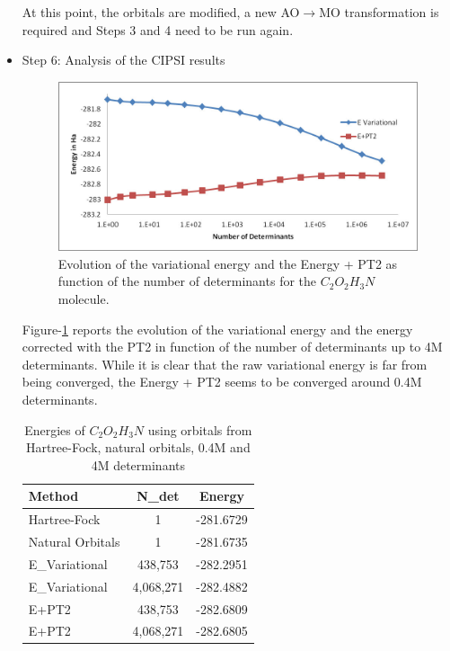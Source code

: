 \begin{itemize}
At this point, the orbitals are modified, a new AO$\rightarrow$MO transformation is required and Steps 3 and 4 need to be run again.\\

\item Step 6: Analysis of the CIPSI results\\
\begin{figure}
\begin{center}
\includegraphics[trim = 2mm 2mm 2mm 2mm, clip,width=0.95\columnwidth]{figures/CIPSI.jpg}
\end{center}
\caption{Evolution of the variational energy and the Energy + PT2 as function of the number of determinants  for the $C_2O_2H_3N$ molecule. 
\label{fig:CIPSI}
}
\end{figure}
Figure-\ref{fig:CIPSI} reports the evolution of the variational energy and the energy corrected with the PT2 in function of the number of determinants up to 4M determinants. While it is clear that the raw variational energy is far from being converged, the Energy + PT2  seems to be converged around 0.4M determinants.\\



\begin{table}[t]
\centering
\caption{Energies of $C_2O_2H_3N$ using orbitals from Hartree-Fock, natural orbitals, 0.4M and 4M determinants}
\label{TAB:CIPSI}
\begin{tabular}{l|c|c}
\hline \hline
Method & N\_det & Energy\\
\hline
Hartree-Fock &    1    & -281.6729\\
Natural Orbitals & 1 & -281.6735\\
E\_Variational &  438,753 & -282.2951 \\
E\_Variational &  4,068,271   & -282.4882 \\
E+PT2 & 438,753& -282.6809 \\
E+PT2 & 4,068,271 & -282.6805  \\ \hline \hline
\end{tabular}
\end{table}



\end{itemize}
